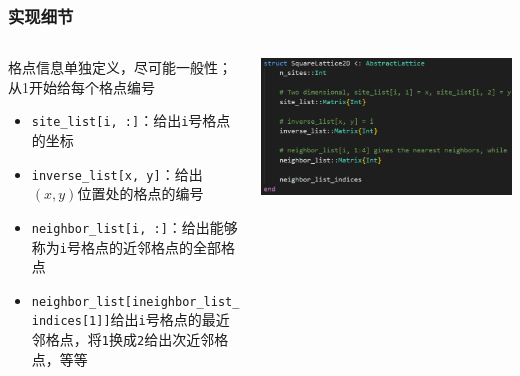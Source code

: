 \documentclass[UTF8]{ctexbeamer}
\begin{document}
\begin{frame}
\frametitle{实现细节}

\begin{columns}

\begin{column}{0.6\textwidth}
    格点信息单独定义，尽可能一般性；从1开始给每个格点编号
    \begin{itemize}
        \item \texttt{site\_list[i, :]}：给出\texttt{i}号格点的坐标
        \item \texttt{inverse\_list[x, y]}：给出$(x, y)$位置处的格点的编号
        \item \texttt{neighbor\_list[i, :]}：给出能够称为\texttt{i}号格点的近邻格点的全部格点
        \item \texttt{neighbor\_list[ineighbor\_list\_indices[1]]}给出\texttt{i}号格点的最近邻格点，将\texttt{1}换成\texttt{2}给出次近邻格点，等等
    \end{itemize}
\end{column}

\begin{column}{0.4\textwidth}
    \includegraphics[width=\textwidth]{lattice-def.PNG}
\end{column}

\end{columns}    

\end{frame}
\end{document}
